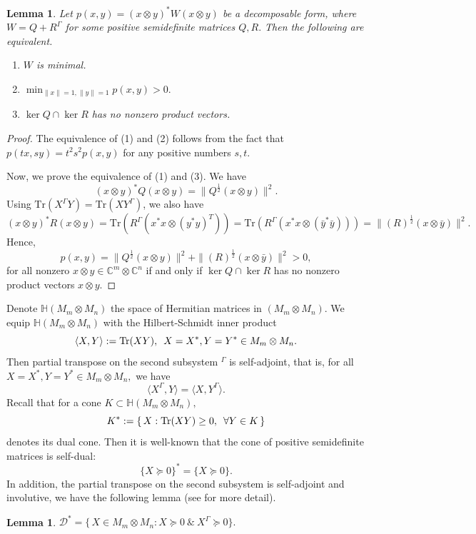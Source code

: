 \documentclass[12pt,a4paper]{amsart}
\theoremstyle{plain}
\newtheorem{lemma}[theorem]{Lemma}
\theoremstyle{remark}
\theoremstyle{definition}
\def \C {\mathbb{C}}
\begin{document}
\begin{lemma}\label{LemmaEdge}
	Let $p(x,y) = (x\otimes y)^*W(x\otimes y)$ be a decomposable form, where $W= Q+R^{\Gamma}$ for some positive semidefinite matrices $Q,R.$ Then the following are equivalent.
\begin{enumerate}
	\item $W$ is minimal.
	\item $\min_{\|x\|=1, \|y\|=1} p(x,y) >0.$
	\item $\ker Q \cap \ker R$ has no nonzero product vectors.
\end{enumerate}
\end{lemma}
\begin{proof}
 The equivalence of (1) and (2) follows from the fact that $p(tx,sy) =t^2s^2p(x,y)$ for any positive numbers $s,t.$ 

Now, we prove the equivalence of (1) and (3). 	We have $$(x\otimes y)^* Q (x\otimes y) = \|Q^{\frac{1}{2}}(x\otimes y)\|^2. $$ %
Using $\mathrm{Tr}(X^{\Gamma}Y)=\mathrm{Tr}(X Y^{\Gamma})$, we also have
\[
 (x\otimes y)^*R(x\otimes y)= \mathrm{Tr}(R^{\Gamma} (x^*x\otimes (y^*y)^T))= \mathrm{Tr}(R^{\Gamma} (x^*x\otimes (\bar{y}^*\bar{y}))) =\|(R)^{\frac{1}{2}}(x\otimes \bar{y})\|^2.
\]
Hence, $$p(x,y)= \|Q^{\frac{1}{2}}(x\otimes y)\|^2 + \|(R)^{\frac{1}{2}}(x\otimes \bar{y})\|^2 >0,$$ for all nonzero $x\otimes y\in \C^m\otimes\C^n$ if and only if $\ker Q \cap \ker R$ has no nonzero product vectors $x\otimes y.$
\end{proof}

Denote $\mathbb{H} (M_m\otimes M_n)$ the space of Hermitian matrices in $(M_m\otimes M_n).$ We equip $\mathbb{H} (M_m\otimes M_n)$ with the Hilbert-Schmidt inner product
\[
\langle X,Y\rangle := \mathrm{Tr}(XY), \enskip
X =X^*,Y=Y^* \in M_m\otimes M_n.
\]
Then partial transpose on the second subsystem $^{\Gamma}$ is self-adjoint, that is, 
for all $X =X^*,Y=Y^*\in M_m\otimes M_n,$ we have
\[
\langle X^{\Gamma},Y\rangle = \langle X, Y^{\Gamma} \rangle.
\]
Recall that for a cone $K \subset \mathbb{H} (M_m\otimes M_n),$
\[
K^* := \{\, X : \mathrm{Tr}(XY)\ge 0, \enskip \forall Y\in K \,\}
\]
denotes its dual cone. Then it is well-known that the cone of positive semidefinite matrices is self-dual:
\[
\{X\succeq 0\}^* = \{X\succeq 0\}.
\]
In addition, the partial transpose on the second subsystem is self-adjoint and involutive, we have the following lemma (see \cite{Keybook} for more detail).
\begin{lemma}\label{dualD}
 $ \mathcal D^* = \{\, X \in M_m\otimes M_n : X\succeq 0 \ \& \  X^{\Gamma}\succeq 0 \}. $
\end{lemma}
\end{document}
